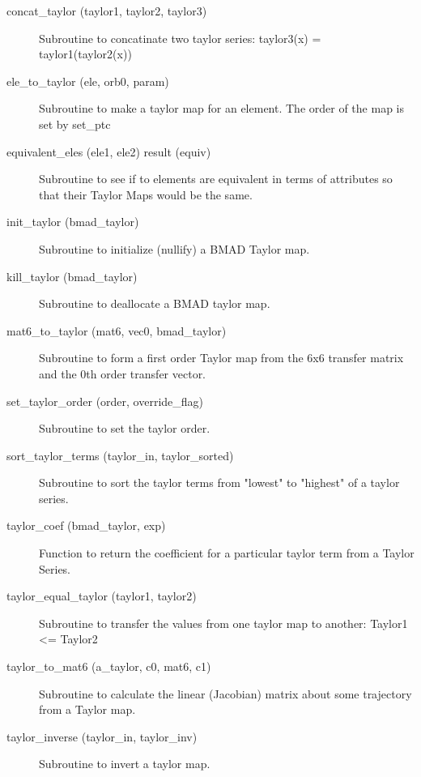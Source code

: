 \begin{description}

\item[concat\_taylor (taylor1, taylor2, taylor3)] \Newline
Subroutine to concatinate two taylor series: taylor3(x) = taylor1(taylor2(x)) 

\item[ele\_to\_taylor (ele, orb0, param)] \Newline
Subroutine to make a taylor map for an element. The order of the map is set by set\_ptc 

\item[equivalent\_eles (ele1, ele2) result (equiv)] \Newline 
     Subroutine to see if to elements are equivalent in terms of attributes so
     that their Taylor Maps would be the same. 

\item[init\_taylor (bmad\_taylor)] \Newline
Subroutine to initialize (nullify) a BMAD Taylor map. 

\item[kill\_taylor (bmad\_taylor)] \Newline
Subroutine to deallocate a BMAD taylor map. 

\item[mat6\_to\_taylor (mat6, vec0, bmad\_taylor)] \Newline
Subroutine to form a first order Taylor map from the 6x6 transfer matrix 
and the 0th order transfer vector. 

\item[set\_taylor\_order (order, override\_flag)] \Newline
Subroutine to set the taylor order. 

\item[sort\_taylor\_terms (taylor\_in, taylor\_sorted)] \Newline
Subroutine to sort the taylor terms from "lowest" to "highest" of a taylor series. 

\item[taylor\_coef (bmad\_taylor, exp)] \Newline 
Function to return the coefficient for a particular taylor term from a Taylor Series.

\item[taylor\_equal\_taylor (taylor1, taylor2)] \Newline
Subroutine to transfer the values from one taylor map to another: Taylor1 <= Taylor2 

\item[taylor\_to\_mat6 (a\_taylor, c0, mat6, c1)] \Newline
Subroutine to calculate the linear (Jacobian) matrix about some trajectory from a Taylor map. 

\item[taylor\_inverse (taylor\_in, taylor\_inv)] \Newline
Subroutine to invert a taylor map. 


\end{description}

